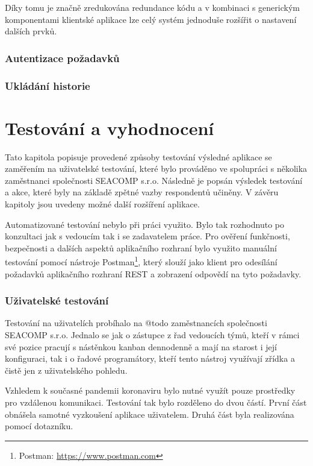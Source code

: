 Díky tomu je značně zredukována redundance kódu a v kombinaci s generickým komponentami klientské aplikace lze celý systém jednoduše rozšířit o nastavení dalších prvků.


\subsection{Autentizace požadavků}
\blindtext


\subsection{Ukládání historie}
\blindtext


\chapter{Testování a vyhodnocení}
Tato kapitola popisuje provedené způsoby testování výsledné aplikace se zaměřením na uživatelské testování, které bylo prováděno ve spolupráci s několika zaměstnanci společnosti SEACOMP s.r.o. Následně je popsán výsledek testování a akce, které byly na základě zpětné vazby respondentů učiněny. V závěru kapitoly jsou uvedeny možné další rozšíření aplikace.

Automatizované testování nebylo při práci využito. Bylo tak rozhodnuto po konzultaci jak s vedoucím tak i se zadavatelem práce. Pro ověření funkčnosti, bezpečnosti a dalších aspektů aplikačního rozhraní bylo využito manuální testování pomocí nástroje Postman\footnote{Postman: \url{https://www.postman.com}}, který slouží jako klient pro odesílání požadavků aplikačního rozhraní REST a zobrazení odpovědí na tyto požadavky.

\subsection{Uživatelské testování}
Testování na uživatelích probíhalo na @todo zaměstnancích společnosti SEACOMP s.r.o. Jednalo se jak o zástupce z řad vedoucích týmů, kteří v rámci své pozice pracují s nástěnkou kanban dennodenně a mají na starost i její konfiguraci, tak i o řadové programátory, kteří tento nástroj využívají zřídka a čistě jen z uživatelského pohledu.

Vzhledem k současné pandemii koronaviru bylo nutné využít pouze prostředky pro vzdálenou komunikaci. Testování tak bylo rozděleno do dvou částí. První část obnášela samotné vyzkoušení aplikace uživatelem. Druhá část byla realizována pomocí dotazníku.


